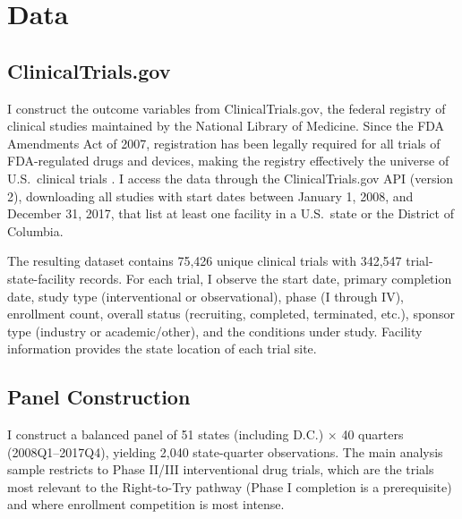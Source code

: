 \documentclass[12pt]{article}
\begin{document}
\section{Data}\label{sec:data}

\subsection{ClinicalTrials.gov}

I construct the outcome variables from ClinicalTrials.gov, the federal registry of clinical studies maintained by the National Library of Medicine. Since the FDA Amendments Act of 2007, registration has been legally required for all trials of FDA-regulated drugs and devices, making the registry effectively the universe of U.S.\ clinical trials \citep{zarin2011clinicaltrials}. I access the data through the ClinicalTrials.gov API (version 2), downloading all studies with start dates between January 1, 2008, and December 31, 2017, that list at least one facility in a U.S.\ state or the District of Columbia.

The resulting dataset contains 75,426 unique clinical trials with 342,547 trial-state-facility records. For each trial, I observe the start date, primary completion date, study type (interventional or observational), phase (I through IV), enrollment count, overall status (recruiting, completed, terminated, etc.), sponsor type (industry or academic/other), and the conditions under study. Facility information provides the state location of each trial site.

\subsection{Panel Construction}

I construct a balanced panel of 51 states (including D.C.) $\times$ 40 quarters (2008Q1--2017Q4), yielding 2,040 state-quarter observations. The main analysis sample restricts to Phase II/III interventional drug trials, which are the trials most relevant to the Right-to-Try pathway (Phase I completion is a prerequisite) and where enrollment competition is most intense.
\end{document}
